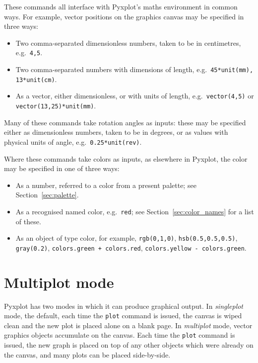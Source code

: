 These commands all interface with Pyxplot's maths environment in common ways.
For example, vector positions on the graphics canvas may be specified in three
ways:

\begin{itemize}
\item Two comma-separated dimensionless numbers, taken to be in centimetres, e.g.\ {\tt 4,5}.
\item Two comma-separated numbers with dimensions of length, e.g.\ {\tt 45*unit(mm), 13*unit(cm)}.
\item As a vector, either dimensionless, or with units of length, e.g.\ {\tt vector(4,5)} or {\tt vector(13,25)*unit(mm)}.
\end{itemize}

Many of these commands take rotation angles as inputs: these may be specified either as dimensionless numbers, taken to be in degrees,
or as values with physical units of angle, e.g.\ {\tt 0.25*unit(rev)}.

Where these commands take colors as inputs, as elsewhere in Pyxplot, the color may be specified in one of three ways:

\begin{itemize}
\item As a number, referred to a color from a present palette; see Section~\ref{sec:palette}.
\item As a recognised named color, e.g.\ {\tt red}; see Section~\ref{sec:color_names} for a list of these.
\item As an object of type color, for example, {\tt rgb(0,1,0)}, {\tt hsb(0.5,0.5,0.5)}, {\tt gray(0.2)}, {\tt colors.green + colors.red}, {\tt colors.yellow - colors.green}.
\end{itemize}

\section{Multiplot mode}
\label{sec:multiplot}

Pyxplot has two modes in which it can produce graphical output. In {\it
singleplot} mode, the default, each time the {\tt plot} command is issued, the
canvas is wiped clean and the new plot is placed alone on a blank page. In {\it
multiplot} mode, vector graphics objects accumulate on the canvas. Each time
the {\tt plot} command is issued, the new graph is placed on top of any other
objects which were already on the canvas, and many plots can be placed
side-by-side.

